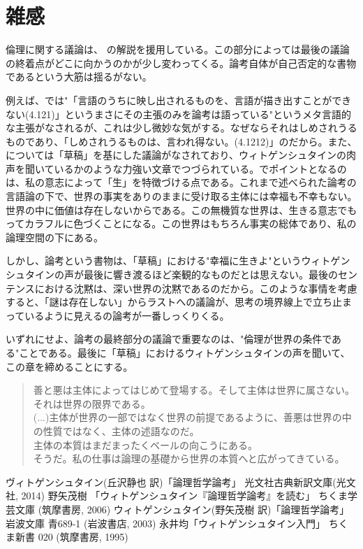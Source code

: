 \documentclass[12pt]{jsarticle}
\begin{document}
\section{雑感}
倫理に関する議論は、\cite{光文社} の解説を援用している。この部分によっては最後の議論の終着点がどこに向かうのかが少し変わってくる。論考自体が自己否定的な書物であるという大筋は揺るがない。
\par
例えば、\cite{入門}では"「言語のうちに映し出されるものを、言語が描き出すことができない(4.121)」というまさにその主張のみを論考は語っている"というメタ言語的な主張がなされるが、これは少し微妙な気がする。なぜならそれはしめされうるものであり、「しめされうるものは、言われ得ない。(4.1212)」のだから。また、\cite{読む, 岩波}については「草稿」を基にした議論がなされており、ウィトゲンシュタインの肉声を聞いているかのような力強い文章でつづられている。\cite{読む, 岩波}でポイントとなるのは、私の意志によって「生」を特徴づける点である。これまで述べられた論考の言語論の下で、世界の事実をありのままに受け取る主体には幸福も不幸もない。世界の中に価値は存在しないからである。この無機質な世界は、生きる意志でもってカラフルに色づくことになる。この世界はもちろん事実の総体であり、私の論理空間の下にある。
\par
しかし、論考という書物は、「草稿」における"幸福に生きよ"というウィトゲンシュタインの声が最後に響き渡るほど楽観的なものだとは思えない。最後のセンテンスにおける沈黙は、深い世界の沈黙であるのだから。このような事情を考慮すると、「謎は存在しない」からラストへの議論が、思考の境界線上で立ち止まっているように見える\cite{光文社}の論考が一番しっくりくる。
\par
いずれにせよ、論考の最終部分の議論で重要なのは、"倫理が世界の条件である"ことである。最後に「草稿」におけるウィトゲンシュタインの声を聞いて、この章を締めることにする。

\begin{quote}
善と悪は主体によってはじめて登場する。そして主体は世界に属さない。それは世界の限界である。\\
(...)主体が世界の一部ではなく世界の前提であるように、善悪は世界の中の性質ではなく、主体の述語なのだ。\\
主体の本質はまだまったくベールの向こうにある。\\
そうだ。私の仕事は論理の基礎から世界の本質へと広がってきている。
\end{quote}

\newpage
\begin{thebibliography}{9}
  ヴィトゲンシュタイン(丘沢静也 訳)「論理哲学論考」 光文社古典新訳文庫(光文社, 2014)
  野矢茂樹 「ウィトゲンシュタイン『論理哲学論考』を読む」 ちくま学芸文庫 (筑摩書房, 2006)
  ウィトゲンシュタイン(野矢茂樹 訳)「論理哲学論考」 岩波文庫 青689-1 (岩波書店, 2003)
  永井均「ウィトゲンシュタイン入門」 ちくま新書 020 (筑摩書房, 1995)
\end{thebibliography}
\end{document}
